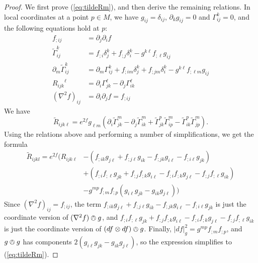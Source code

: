 \documentclass{amsart}
\numberwithin{equation}{section}
\newcommand{\del}{\partial}
\theoremstyle{plain}
\theoremstyle{definition}
\theoremstyle{remark}
\begin{document}
\begin{proof}
    We first prove (\ref{eq:tildeRm}), and then derive the remaining relations. In local coordinates at a point $p \in M$, we have $g_{ij} = \delta_{ij}$, $\del_k g_{ij} = 0$ and $\Gamma_{ij}^k = 0$, and the following equations hold at $p$:
    \begin{align*}
        f_{;ij} &= \del_j \del_i f \\ 
        \widetilde{\Gamma}_{ij}^k &= f_{;i} \delta_j^k + f_{;j}\delta_i^k - g^{k\ell}f_{;\ell}g_{ij}\\
        \del_m\widetilde{\Gamma}_{ij}^k &= \del_m \Gamma_{ij}^k + f_{;im} \delta_j^k + f_{;jm}\delta_i^k - g^{k\ell}f_{;\ell m}g_{ij}\\
        {R_{ijk}}^\ell &= \del_i \Gamma_{jk}^\ell - \del_j \Gamma_{ik}^\ell\\
        (\nabla^2 f)_{ij} &= \del_i \del_j f = f_{;ij}
    \end{align*}
    We have
    \[\widetilde{R}_{ijk\ell} =  e^{2f} g_{\ell m} \left(\del_i \widetilde{\Gamma}_{jk}^m - \del_j \widetilde{\Gamma}_{ik}^m + \widetilde{\Gamma}_{jk}^p\widetilde{\Gamma}_{ip}^m - \widetilde{\Gamma}_{ik}^p\widetilde{\Gamma}_{jp}^m \right). \]
    Using the relations above and performing a number of simplifications, we get the formula
    \begin{align*}
        \widetilde{R}_{ijkl} = e^{2f} \big( R_{ijk\ell} &- (f_{;ik} g_{j\ell} + f_{;j\ell} g_{ik} - f_{;jk} g_{i\ell} - f_{;i\ell} g_{jk}) \\
        &+ (f_{;i} f_{;\ell} g_{jk} + f_{;j} f_{;k} g_{i\ell} - f_{;i} f_{;k} g_{j\ell} - f_{;j} f_{;\ell} g_{ik}) \\
        &- g^{mp} f_{;m} f_{;p} (g_{i\ell} g_{jk} - g_{ik} g_{j\ell}) \big)
    \end{align*}
    Since $(\nabla^2 f)_{ij} = f_{;ij}$, the term $f_{;ik} g_{j\ell} + f_{;j\ell} g_{ik} - f_{;jk} g_{i\ell} - f_{;i\ell} g_{jk}$ is just the coordinate version of $(\nabla^2 f) \owedge g$, and $f_{;i} f_{;\ell} g_{jk} + f_{;j} f_{;k} g_{i\ell} - f_{;i} f_{;k} g_{j\ell} - f_{;j} f_{;\ell} g_{ik}$ is just the coordinate version of $(df \otimes df) \owedge g$. Finally, $|df|_g^2 = g^{mp}f_{;m} f_{;p}$, and $g \owedge g$ has components $2(g_{i\ell}g_{jk} - g_{ik}g_{j\ell})$, so the expression simplifies to (\ref{eq:tildeRm}).


\end{proof}
\end{document}
